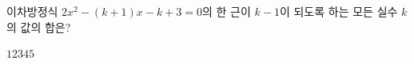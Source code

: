 이차방정식 $2x^2-(k+1)x-k+3=0$의 한 근이 $k-1$이 되도록 하는 모든 실수 $k$의 값의 합은?
\begin{choices32}{$1$}{$2$}{$3$}{$4$}{$5$}\end{choices32}
